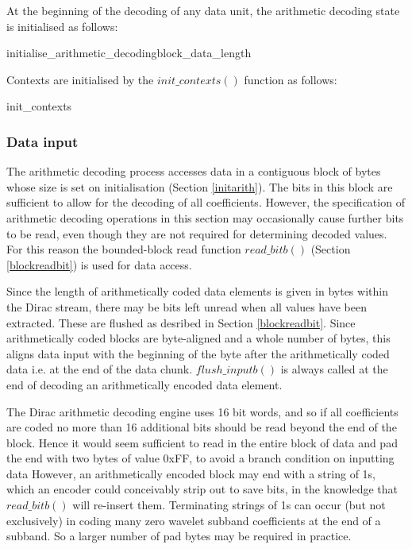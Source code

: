 At the beginning of the decoding of any data unit, the arithmetic
decoding state is initialised as follows:

\begin{pseudo}{initialise\_arithmetic\_decoding}{block\_data\_length}
\bsEND
{}
\end{pseudo}

Contexts are initialised by the $init\_contexts()$ function as follows:

\begin{pseudo}{init\_contexts}{}
\bsEND
\end{pseudo}

\subsubsection{Data input}
\label{inputarith}

The arithmetic decoding process accesses data in a contiguous block of bytes
whose size is set on initialisation (Section \ref{initarith}). The bits in this
block are sufficient to allow for the
decoding of all coefficients. However, the specification of arithmetic
decoding operations in this section may occasionally cause further bits to be read,
even though they are not required for determining decoded values. For this
reason the bounded-block read function $read\_bitb()$ (Section \ref{blockreadbit}) is 
used for data access.

Since the length of arithmetically coded data elements is given in bytes within the Dirac
stream, there may be bits left unread when all values have been extracted. These
are flushed as desribed in Section \ref{blockreadbit}. Since arithmetically coded blocks
are byte-aligned and a whole number of bytes, this aligns data input with the beginning of the byte 
after the arithmetically coded data i.e. at the end of the
data chunk. $flush\_inputb()$ is always called at the end of decoding an arithmetically encoded
data element.

\begin{informative}
The Dirac arithmetic decoding engine uses 16 bit words, and so if all coefficients are
coded no more than 16 additional bits should be read beyond the end of the block. Hence it 
would seem sufficient to read in the entire block of data and pad the end with two bytes of value 0xFF,
to avoid a branch condition on inputting data
However, an arithmetically encoded block may end with a string of 1s, which an encoder could
conceivably strip out to save bits, in the knowledge that $read\_bitb()$ will re-insert them. Terminating
strings of 1s can occur (but not exclusively) in coding many zero wavelet subband coefficients at the end
of a subband. So a larger number of pad bytes may be required in practice.
\end{informative}

